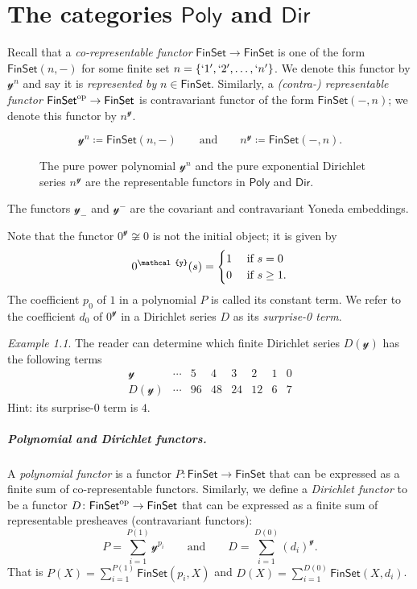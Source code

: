 \documentclass[11pt, article, one side]{memoir}
\theoremstyle{theorem}
\theoremstyle{definition}
\theoremstyle{remark}
\newtheorem{example}[equation]{Example}
\newcommand{\Cat}[1]{\mathsf{#1}}%
\newcommand{\op}{^\tn{op}}
\newcommand{\tn}[1]{\textnormal{#1}}
\newcommand{\finset}{\Cat{FinSet}}
\newcommand{\yon}{\mathcal{y}}
\newcommand{\poly}{\Cat{Poly}}
\newcommand{\dir}{\Cat{Dir}}
\newcommand{\qqand}{\qquad\text{and}\qquad}
\begin{document}
\chapter{The categories $\poly$ and $\dir$}
Recall that a \emph{co-representable functor} $\finset\to\finset$ is one of the form $\finset(n, -)$ for some finite set $n=\{`1', `2',\ldots,`n'\}$. We denote this functor by $\yon^n$ and say it is \emph{represented by} $n\in\finset$. Similarly, a \emph{(contra-) representable functor} $\finset\op\to\finset$ is contravariant functor of the form $\finset(-,n)$; we denote this functor by $n^\yon$.
\begin{figure}
\[
  \yon^n \coloneqq \finset(n,-)
  \qqand
  n^\yon\coloneqq\finset(-,n).
\]
  \caption{The pure power polynomial $\yon^n$ and the pure exponential Dirichlet series $n^\yon$ are the representable functors in $\poly$ and $\dir$.}
\end{figure}
The functors $\yon_-$ and $\yon^-$ are the covariant and contravariant Yoneda embeddings.

Note that the functor $0^\yon\not\cong 0$ is not the initial object; it is given by
\[
0^\yon(s)=
\begin{cases}
1&\tn{ if } s=0\\
0&\tn{ if } s\geq1.
\end{cases}
\]
The coefficient $p_0$ of $1$ in a polynomial $P$ is called its constant term. We refer to the coefficient $d_0$ of $0^\yon$ in a Dirichlet series $D$ as its \emph{surprise-0 term}.

\begin{example}
The reader can determine which finite Dirichlet series $D(\yon)$ has the following terms
\[
\begin{array}{c|ccccccc}
\yon&
\cdots&
5&
4&
3&
2&
1&
0
\\\hline
D(\yon)&
\cdots&
96&
48&
24&
12&
6&
7
\end{array}
\]
Hint: its surprise-0 term is $4$.
\end{example}

\paragraph{Polynomial and Dirichlet functors.}
A \emph{polynomial functor} \cite{GambinoKock} is a functor $P\colon\finset\to\finset$ that can be expressed as a finite sum of co-representable functors. Similarly, we define a \emph{Dirichlet functor} to be a functor $D\colon\finset\op\to\finset$ that can be expressed as a finite sum of representable presheaves (contravariant functors):
\begin{equation}\label{eqn.finite_sum}
  P=\sum_{i=1}^{P(1)}\yon^{p_i}
  \qqand
  D=\sum_{i=1}^{D(0)}(d_i)^\yon.
\end{equation}
That is $P(X)=\sum_{i=1}^{P(1)}\finset(p_i,X)$ and $D(X)=\sum_{i=1}^{D(0)}\finset(X,d_i)$.
\end{document}
